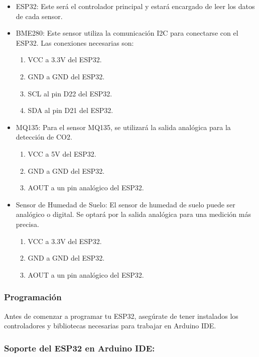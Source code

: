 \documentclass[../main]{subfiles}
\begin{document}
\begin{itemize}
	\item ESP32: Este será el controlador principal y estará encargado de leer los datos de cada sensor.
	\item BME280: Este sensor utiliza la comunicación I2C para conectarse con el ESP32. Las conexiones necesarias son:
	      \begin{enumerate}
		      \item VCC a 3.3V del ESP32.
		      \item GND a GND del ESP32.
		      \item SCL al pin D22 del ESP32.
		      \item SDA al pin D21 del ESP32.
	      \end{enumerate}
	\item MQ135: Para el sensor MQ135, se utilizará la salida analógica para la detección de CO2.
	      \begin{enumerate}
		      \item VCC a 5V del ESP32.
		      \item GND a GND del ESP32.
		      \item AOUT a un pin analógico del ESP32.
	      \end{enumerate}
	\item Sensor de Humedad de Suelo: El sensor de humedad de suelo puede ser analógico o digital. Se optará por la salida analógica para una medición más precisa.
	      \begin{enumerate}
		      \item VCC a 3.3V del ESP32.
		      \item GND a GND del ESP32.
		      \item AOUT a un pin analógico del ESP32.
	      \end{enumerate}
\end{itemize}

\subsubsection{Programación}

Antes de comenzar a programar tu ESP32, aseg\'urate de tener instalados los controladores y bibliotecas necesarias para trabajar en Arduino IDE.

\subsubsection{Soporte del ESP32 en Arduino IDE:}
\end{document}
